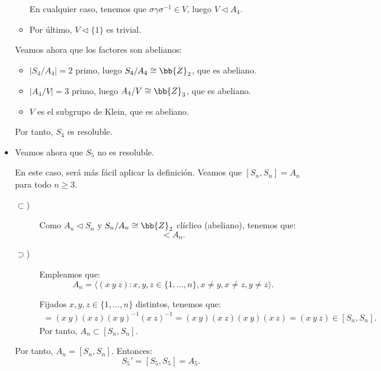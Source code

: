 \begin{ejercicio}
\begin{itemize}
\begin{itemize}
            En cualquier caso, tenemos que $\sigma\gamma\sigma^{-1} \in V$, luego \(V\lhd A_4\).

            \item Por último, \(V\lhd \{1\}\) es trivial.
        \end{itemize}

        Veamos ahora que los factores son abelianos:
        \begin{itemize}
            \item \(|S_4/A_4| = 2\) primo, luego \(S_4/A_4\cong \bb{Z}_2\), que es abeliano.
            \item \(|A_4/V| = 3\) primo, luego \(A_4/V\cong \bb{Z}_3\), que es abeliano.
            \item $V$ es el subgrupo de Klein, que es abeliano.
        \end{itemize}

        Por tanto, \(S_4\) es resoluble.

        \item Veamos ahora que \(S_5\) no es resoluble.
        
        En este caso, será más fácil aplicar la definición. Veamos que $[S_n, S_n] = A_n$ para todo \(n\geq 3\).
        \begin{description}
            \item[$\subset$)] Como $A_n\lhd S_n$ y $S_n/A_n\cong \bb{Z}_2$ clíclico (abeliano), tenemos que:
            \begin{equation*}
                [S_n, S_n] < A_n.
            \end{equation*}

            \item[$\supset$)] Empleamos que:
            \begin{equation*}
                A_n = \langle (x\ y\ z) : x, y,z \in \{1, \ldots, n\}, x\neq y, x\neq z, y\neq z \rangle.
            \end{equation*}

            Fijados \(x, y, z\in \{1, \ldots, n\}\) distintos, tenemos que:
            \begin{align*}
                [(x\ y), (x\ z)] = (x\ y)(x\ z)(x\ y)^{-1}(x\ z)^{-1}
                = (x\ y)(x\ z)(x\ y)(x\ z)
                = (x\ y\ z) \in [S_n, S_n].
            \end{align*}
            Por tanto, \(A_n\subset [S_n, S_n]\).
        \end{description}

        Por tanto, \(A_n = [S_n, S_n]\). Entonces:
        \begin{equation*}
            S_5' = [S_5, S_5] = A_5.
        \end{equation*}


\end{itemize}
\end{ejercicio}
